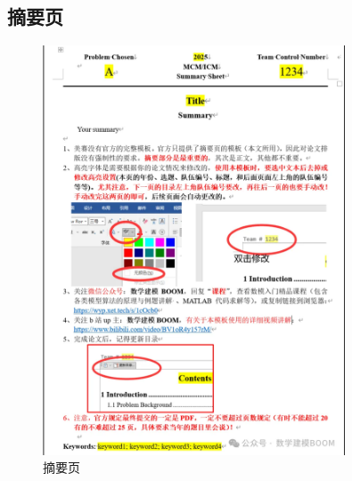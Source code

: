 \documentclass[]{article}
\begin{document}
		\subsection{摘要页}
			\begin{figure}[htbp]
				\centering
				\includegraphics[width=0.8\textwidth]{2}
				\caption{摘要页}
				\label{fig:2}
			\end{figure}
	
\end{document}
